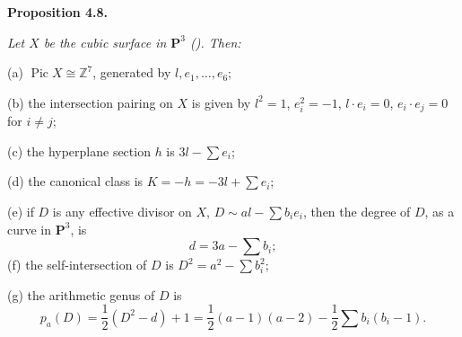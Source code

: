 {\medskip
\noindent\hypertarget{result-V-4.8}{}\textbf{Proposition 4.8.} {\itshape Let $X$ be the cubic surface in $\mathbf P^3$ (). Then:

\hspace*{1.5em}(a) $\operatorname{Pic}X\cong\mathbb Z^7$, generated by $l,e_1,\dots,e_6$;

\hspace*{1.5em}(b) the intersection pairing on $X$ is given by $l^2=1$, $e_i^2=-1$, $l\cdot e_i=0$, $e_i\cdot e_j=0$ for $i\ne j$;

\hspace*{1.5em}(c) the hyperplane section $h$ is $3l-\sum e_i$;

\hspace*{1.5em}(d) the canonical class is $K=-h=-3l+\sum e_i$;

\hspace*{1.5em}(e) if $D$ is any effective divisor on $X$, $D\sim al-\sum b_ie_i$, then the degree of $D$, as a curve in $\mathbf P^3$, is
\[
d=3a-\sum b_i;
\]
\hspace*{1.5em}(f) the self-intersection of $D$ is $D^2=a^2-\sum b_i^2$;

\hspace*{1.5em}(g) the arithmetic genus of $D$ is
\[
p_a(D)=\frac12(D^2-d)+1=\frac12(a-1)(a-2)-\frac12\sum b_i(b_i-1).
\]}}
